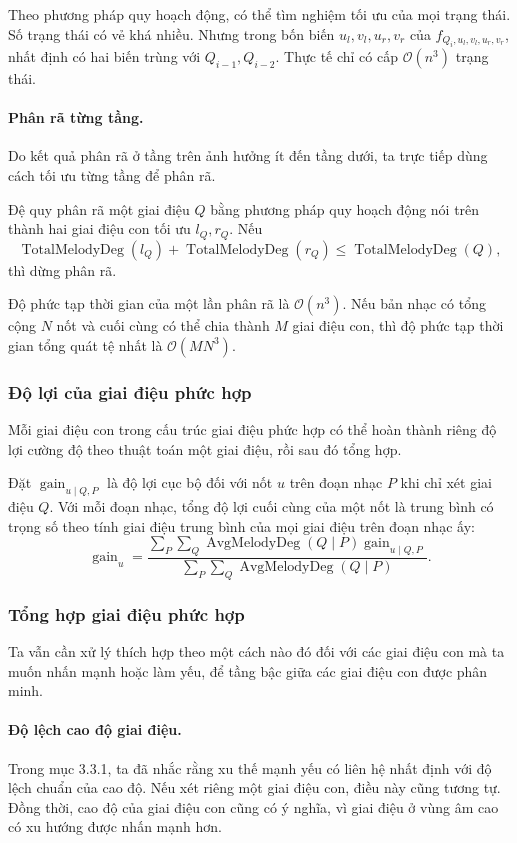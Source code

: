 \documentclass[11pt]{article}
\newcommand{\Oh}{\mathcal{O}}
\begin{document}
Theo phương pháp quy hoạch động, có thể tìm nghiệm tối ưu của mọi trạng thái.
Số trạng thái có vẻ khá nhiều. Nhưng trong bốn biến \(u_l,v_l,u_r,v_r\) của
\(f_{Q_i,u_l,v_l,u_r,v_r}\), nhất định có hai biến trùng với
\(Q_{i-1},Q_{i-2}\). Thực tế chỉ có cấp \(\Oh(n^3)\) trạng thái.

\paragraph{Phân rã từng tầng.}
Do kết quả phân rã ở tầng trên ảnh hưởng ít đến tầng dưới, ta trực tiếp dùng
cách tối ưu từng tầng để phân rã.

Đệ quy phân rã một giai điệu \(Q\) bằng phương pháp quy hoạch động nói trên
thành hai giai điệu con tối ưu \(l_Q,r_Q\). Nếu
\[
  \operatorname{TotalMelodyDeg}(l_Q)+\operatorname{TotalMelodyDeg}(r_Q)
  \le \operatorname{TotalMelodyDeg}(Q),
\]
thì dừng phân rã.

Độ phức tạp thời gian của một lần phân rã là \(\Oh(n^3)\). Nếu bản nhạc có
tổng cộng \(N\) nốt và cuối cùng có thể chia thành \(M\) giai điệu con, thì
độ phức tạp thời gian tổng quát tệ nhất là \(\Oh(MN^3)\).

\subsubsection{Độ lợi của giai điệu phức hợp}

Mỗi giai điệu con trong cấu trúc giai điệu phức hợp có thể hoàn thành riêng
độ lợi cường độ theo thuật toán một giai điệu, rồi sau đó tổng hợp.

Đặt \(\operatorname{gain}_{u\mid Q,P}\) là độ lợi cục bộ đối với nốt \(u\)
trên đoạn nhạc \(P\) khi chỉ xét giai điệu \(Q\). Với mỗi đoạn nhạc, tổng độ
lợi cuối cùng của một nốt là trung bình có trọng số theo tính giai điệu trung
bình của mọi giai điệu trên đoạn nhạc ấy:
\[
  \operatorname{gain}_u=
  \frac{\sum_P\sum_Q
  \operatorname{AvgMelodyDeg}(Q\mid P)\operatorname{gain}_{u\mid Q,P}}
  {\sum_P\sum_Q\operatorname{AvgMelodyDeg}(Q\mid P)}.
\]

\subsubsection{Tổng hợp giai điệu phức hợp}

Ta vẫn cần xử lý thích hợp theo một cách nào đó đối với các giai điệu con mà
ta muốn nhấn mạnh hoặc làm yếu, để tầng bậc giữa các giai điệu con được phân
minh.

\paragraph{Độ lệch cao độ giai điệu.}
Trong mục 3.3.1, ta đã nhắc rằng xu thế mạnh yếu có liên hệ nhất định với độ
lệch chuẩn của cao độ. Nếu xét riêng một giai điệu con, điều này cũng tương
tự. Đồng thời, cao độ của giai điệu con cũng có ý nghĩa, vì giai điệu ở vùng
âm cao có xu hướng được nhấn mạnh hơn.
\end{document}
